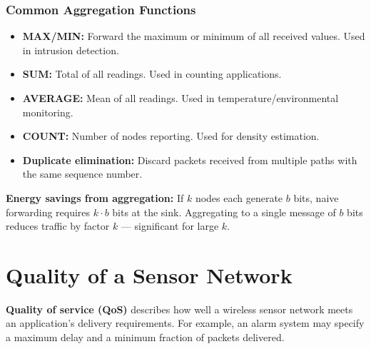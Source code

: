 \documentclass[12pt,a4paper]{article}
\begin{document}
\subsubsection*{Common Aggregation Functions}
\begin{itemize}[leftmargin=*, itemsep=2pt]
  \item \textbf{MAX/MIN:} Forward the maximum or minimum of all received values. Used in intrusion detection.
  \item \textbf{SUM:} Total of all readings. Used in counting applications.
  \item \textbf{AVERAGE:} Mean of all readings. Used in temperature/environmental monitoring.
  \item \textbf{COUNT:} Number of nodes reporting. Used for density estimation.
  \item \textbf{Duplicate elimination:} Discard packets received from multiple paths with the same sequence number.
\end{itemize}

\textbf{Energy savings from aggregation:} If $k$ nodes each generate $b$ bits, naive forwarding requires $k \cdot b$ bits at the sink. Aggregating to a single message of $b$ bits reduces traffic by factor $k$ --- significant for large $k$.

\section{Quality of a Sensor Network}

\begin{tcolorbox}[defbox, title={Quality of Service in Sensor Networks}]
\textbf{Quality of service (QoS)} describes how well a wireless sensor network meets an application's delivery requirements. For example, an alarm system may specify a maximum delay and a minimum fraction of packets delivered.
\end{tcolorbox}
\end{document}

